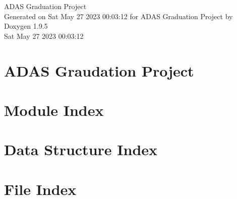 \documentclass[twoside]{book}
\newcommand{\+}{\discretionary{\mbox{\scriptsize$\hookleftarrow$}}{}{}}
\newcommand{\clearemptydoublepage}{%
    \newpage{\pagestyle{empty}\cleardoublepage}%
  }
\begin{document}
  \raggedbottom
    \hypersetup{pageanchor=false,
                bookmarksnumbered=true,
                pdfencoding=unicode
               }
  \begin{titlepage}
  \vspace*{7cm}
  \begin{center}%
  {\Large ADAS Graduation Project}\\
  \vspace*{1cm}
  {\large Generated on Sat May 27 2023 00\+:03\+:12 for ADAS Graduation Project by Doxygen 1.9.5}\\
    \vspace*{0.5cm}
    {\small Sat May 27 2023 00:03:12}
  \end{center}
  \end{titlepage}
  \clearemptydoublepage
  \tableofcontents
  \clearemptydoublepage
  \hypersetup{pageanchor=true}
\chapter{ADAS Graudation Project}
\label{index}\hypertarget{index}{}
\chapter{Module Index}

\chapter{Data Structure Index}

\chapter{File Index}

\end{document}
